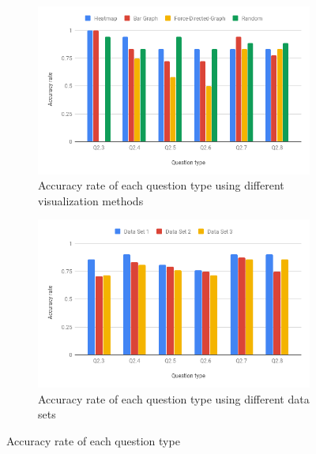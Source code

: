 \begin{figure}[h]
	\centering
	\begin{subfigure}[b]{0.48\textwidth}
		\centering
		\includegraphics[width=\textwidth]{pictures/accuracy}
		\caption{Accuracy rate of each question type using different visualization methods}
		\label{fig:accuracyV}
	\end{subfigure}
	\hfill
	\begin{subfigure}[b]{0.48\textwidth}
		\centering
		\includegraphics[width=\textwidth]{pictures/accuracyDS}
		\caption{Accuracy rate of each question type using different data sets}
		\label{fig:accuracyDS}
	\end{subfigure}
	\caption{Accuracy rate of each question type}
	\label{fig:accuracy}
\end{figure}

